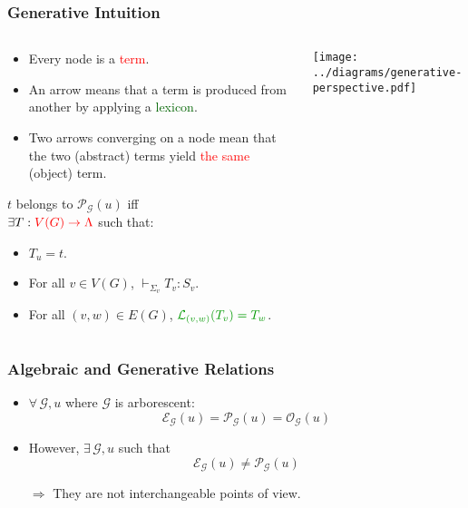 \documentclass{beamer}
\begin{document}
\begin{frame}
  \frametitle{Generative Intuition}

  \begin{columns}[c]
    \begin{column}{0.7\textwidth}
      \begin{block}{}
        \begin{itemize}
        \item Every node is a \textcolor{red}{term}.
        \item An arrow means that a term is produced from another by
          applying a \textcolor{darkgreen}{lexicon}.
        \item Two arrows converging on a node mean that the two (abstract)
          terms yield \textcolor{red}{the same} (object) term.
        \end{itemize}
      \end{block}

      \vspace{3 mm}

      $t$ belongs to $\mathcal{P}_{\mathcal{G}}(u)$ iff \\$\exists T :
      \textcolor{red}{V(G) \to \Lambda}$ such that:
      \begin{itemize}
      \item $T_u = t$.
      \item For all $v \in V(G)$, $\vdash_{\Sigma_v} T_v : S_v$.
      \item For all $(v,w) \in E(G)$,
        $\textcolor{darkgreen}{\mathcal{L}_{(v,w)}(T_v) = T_w}$.
      \end{itemize}
    \end{column}
    \begin{column}{0.3\textwidth}
      \texttt{[image: ../diagrams/generative-perspective.pdf]}
    \end{column}
  \end{columns}
\end{frame}


\begin{frame}
  \frametitle{Algebraic and Generative Relations}

  \begin{itemize}
  \item $\forall \, \mathcal{G}, u$ where $\mathcal{G}$ is arborescent:
    $$\mathcal{E}_{\mathcal{G}}(u) = \mathcal{P}_{\mathcal{G}}(u)
    = \mathcal{O}_{\mathcal{G}}(u)$$
    \pause
  \item However, $\exists \, \mathcal{G}, u$ such that
    $$\mathcal{E}_{\mathcal{G}}(u) \neq \mathcal{P}_{\mathcal{G}}(u)$$
    \vfill
    \pause
  \item[$\Rightarrow$] They are not interchangeable points of view.
  \end{itemize}
\end{frame}
\end{document}
